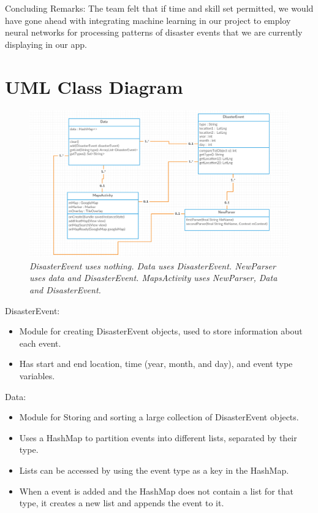 \documentclass[12pt]{article}
\begin{document}
Concluding Remarks: The team felt that if time and skill set permitted, we would have gone ahead with integrating machine learning in our project to employ neural networks for processing patterns of disaster events that we are currently displaying in our app. 

\section{UML Class Diagram}
\begin{figure}[h!]
\includegraphics[scale=0.4]{uml}
\caption{\textit{DisasterEvent uses nothing. Data uses DisasterEvent. NewParser uses data and DisasterEvent. MapsActivity uses NewParser, Data and DisasterEvent.}}
\end{figure}

\noindent DisasterEvent:
\begin{itemize}
\item	Module for creating DisasterEvent objects, used to store information about each event.
\item Has start and end location, time (year, month, and day), and event type variables.
\end{itemize}

\noindent Data:
\begin{itemize}
\item Module for Storing and sorting a large collection of DisasterEvent objects.
\item Uses a HashMap to partition events into different lists, separated by their type.
\item Lists can be accessed by using the event type as a key in the HashMap.
\item When a event is added and the HashMap does not contain a list for that type, it creates a new list and appends the event to it.
\end{itemize}
\end{document}
